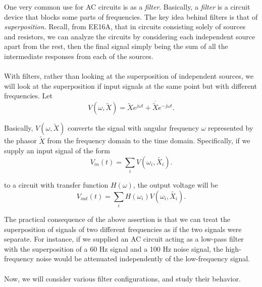 
One very common use for AC circuits is as a \emph{filter}.
Basically, a \emph{filter} is a circuit device that blocks some parts of frequencies.
The key idea behind filters is that of \emph{superposition}.
Recall, from EE16A, that in circuits consisting solely of sources and resistors, we can analyze the circuits by considering each independent source apart from the rest, then the final signal simply being the sum of all the intermediate responses from each of the sources.
\\
\\
With filters, rather than looking at the superposition of independent sources, we will look at the superposition if input signals at the same point but with different frequencies.
Let
\[
  V(\omega, \widetilde{X}) = \widetilde{X}e^{j \omega t} + \overline{\widetilde{X}}e^{-j \omega t}
.\]

Basically, $V(\omega, \widetilde{X})$ converts the signal with angular frequency $\omega$ represented by the phasor $\widetilde{X}$ from the frequency domain to the time domain.
Specifically, if we supply an input signal of the form
\[
  V_{in}(t) = \sum_i V(\omega_i, \widetilde{X_i})
.\]

to a circuit with transfer function $H(\omega)$, the output voltage will be
\[
  V_{out}(t) = \sum_i H(\omega_i)V(\omega_i, \widetilde{X_i})
.\]

The practical consequence of the above assertion is that we can treat the superposition of signals of two different frequencies as if the two signals were separate.
For instance, if we supplied an AC circuit acting as a low-pass filter with the superposition of a 60 Hz signal and a 100 Hz noise signal, the high-frequency noise would be attenuated independently of the low-frequency signal.
\\
\\
Now, we will consider various filter configurations, and study their behavior.



